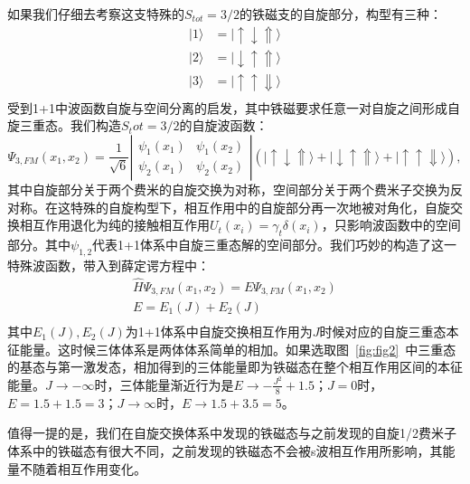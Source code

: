 如果我们仔细去考察这支特殊的$S_{tot}=3/2$的铁磁支的自旋部分，构型有三种：
\begin{equation}
    \begin{split} 
    |1\rangle &= |\uparrow\downarrow\Uparrow\rangle\\
    |2\rangle &= |\downarrow\uparrow\Uparrow\rangle\\
    |3\rangle &= |\uparrow\uparrow\Downarrow\rangle\\
    \end{split}
\end{equation} 
受到1+1中波函数自旋与空间分离的启发，其中铁磁要求任意一对自旋之间形成自旋三重态。我们构造$S_tot=3/2$的自旋波函数：
\begin{equation}
\Psi_{3,FM}(x_1,x_2)=\frac{1}{\sqrt{6}}\left|\begin{array}{cc}\psi_1(x_1) & \psi_1(x_2) \\\psi_2(x_1) & \psi_2(x_2)\end{array}\right| \left(|\uparrow\downarrow\Uparrow\rangle+|\downarrow\uparrow\Uparrow\rangle+|\uparrow\uparrow\Downarrow\rangle\right),
\end{equation}
其中自旋部分关于两个费米的自旋交换为对称，空间部分关于两个费米子交换为反对称。在这特殊的自旋构型下，相互作用中的自旋部分再一次地被对角化，自旋交换相互作用退化为纯的接触相互作用$U_t(x_i)=\gamma_t\delta(x_i)$，只影响波函数中的空间部分。其中$\psi_{1,2}$代表1+1体系中自旋三重态解的空间部分。我们巧妙的构造了这一特殊波函数，带入到薛定谔方程中：
\begin{equation}
\begin{split}
        \hat{H}\Psi_{3,FM}(x_1,x_2) = E\Psi_{3,FM}(x_1,x_2)\\
        E = E_1(J)+E_2(J)\\
\end{split}
\end{equation}
其中$E_1(J), E_2(J)$为1+1体系中自旋交换相互作用为$J$时候对应的自旋三重态本征能量。这时候三体体系是两体体系简单的相加。如果选取图~\ref{fig:fig2}~中三重态的基态与第一激发态，相加得到的三体能量即为铁磁态在整个相互作用区间的本征能量。$J\to-\infty$时，三体能量渐近行为是$E\to-\frac{J^2}{8}+1.5$；$J=0$时，$E=1.5+1.5=3$；$J\to\infty$时，$E\to1.5+3.5=5$。

值得一提的是，我们在自旋交换体系中发现的铁磁态与之前发现的自旋1/2费米子体系中的铁磁态\cite{cui2014ground}有很大不同，之前发现的铁磁态不会被s波相互作用所影响，其能量不随着相互作用变化。

